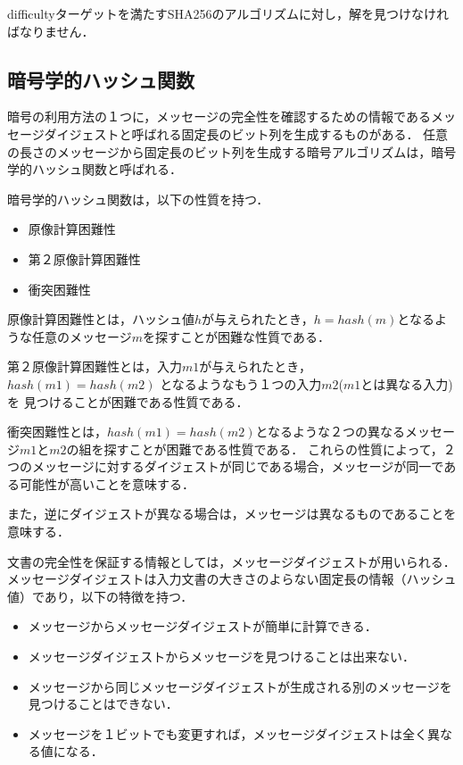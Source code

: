\documentclass[a4paper,12pt]{jsarticle}
\begin{document}
difficultyターゲットを満たすSHA256のアルゴリズムに対し，解を見つけなければなりません．

      \subsection*{暗号学的ハッシュ関数} %

暗号の利用方法の１つに，メッセージの完全性を確認するための情報であるメッセージダイジェストと呼ばれる固定長のビット列を生成するものがある．
任意の長さのメッセージから固定長のビット列を生成する暗号アルゴリズムは，暗号学的ハッシュ関数と呼ばれる．

暗号学的ハッシュ関数は，以下の性質を持つ．
\begin{itemize}
  \item 原像計算困難性
  \item 第２原像計算困難性
  \item 衝突困難性
\end{itemize}

原像計算困難性とは，ハッシュ値$h$が与えられたとき，$ h = hash(m)$となるような任意のメッセージ$m$を探すことが困難な性質である．

第２原像計算困難性とは，入力$m1$が与えられたとき，$ hash(m1) = hash(m2)$ となるようなもう１つの入力$m2$($m1$とは異なる入力)を
見つけることが困難である性質である．

衝突困難性とは，$hash(m1)= hash(m2)$となるような２つの異なるメッセージ$m1$と$m2$の組を探すことが困難である性質である．
これらの性質によって，２つのメッセージに対するダイジェストが同じである場合，メッセージが同一である可能性が高いことを意味する．

また，逆にダイジェストが異なる場合は，メッセージは異なるものであることを意味する．

文書の完全性を保証する情報としては，メッセージダイジェストが用いられる．
メッセージダイジェストは入力文書の大きさのよらない固定長の情報（ハッシュ値）であり，以下の特徴を持つ．

\begin{itemize}
  \item メッセージからメッセージダイジェストが簡単に計算できる．
  \item メッセージダイジェストからメッセージを見つけることは出来ない．
  \item メッセージから同じメッセージダイジェストが生成される別のメッセージを見つけることはできない．
  \item メッセージを１ビットでも変更すれば，メッセージダイジェストは全く異なる値になる．
\end{itemize}
\end{document}
